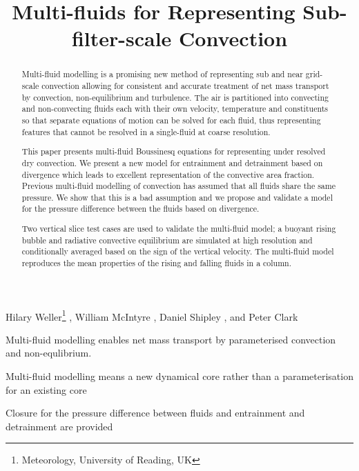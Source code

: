\documentclass[draft]{agujournal2019}
\begin{document}
\title{Multi-fluids for Representing Sub-filter-scale Convection}

\authors
{
    Hilary Weller\thanks{Meteorology, University of Reading, UK}
    ,
    William McIntyre
    ,
    Daniel Shipley
    , and 
    Peter Clark
}



\begin{keypoints}
\item Multi-fluid modelling enables net mass transport by parameterised convection and non-equlibrium.
\item Multi-fluid modelling means a new dynamical core rather than a parameterisation for an existing core
\item Closure for the pressure difference between fluids and entrainment and detrainment are provided
\end{keypoints}

\begin{abstract}
Multi-fluid modelling is a promising new method of representing sub
and near grid-scale convection allowing for consistent and accurate
treatment of net mass transport by convection, non-equilibrium and
turbulence. The air is partitioned into convecting and non-convecting
fluids each with their own velocity, temperature and constituents
so that separate equations of motion can be solved for each fluid,
thus representing features that cannot be resolved in a single-fluid
at coarse resolution. 

This paper presents multi-fluid Boussinesq equations for representing
under resolved dry convection. We present a new model for entrainment
and detrainment based on divergence which leads to excellent representation
of the convective area fraction. Previous multi-fluid modelling of
convection has assumed that all fluids share the same pressure. We
show that this is a bad assumption and we propose and validate a model
for the pressure difference between the fluids based on divergence. 

Two vertical slice test cases are used to validate the multi-fluid
model; a buoyant rising bubble and radiative convective equilibrium
are simulated at high resolution and conditionally averaged based
on the sign of the vertical velocity. The multi-fluid model reproduces
the mean properties of the rising and falling fluids in a  column. 
\end{abstract}
\end{document}
